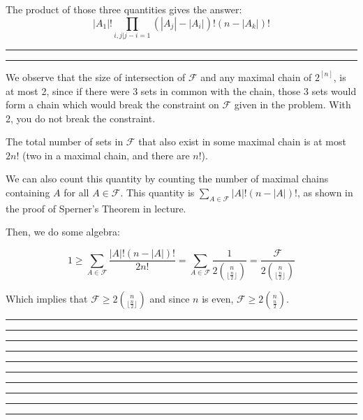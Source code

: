 \documentclass[11pt,letterpaper]{article}
\newcommand{\question}[1] {\vspace{.25in} \hrule\vspace{0.5em}
\noindent{\bf #1} \vspace{0.5em}
\hrule \vspace{.10in}}
\begin{document}
The product of those three quantities gives the answer:
$$|A_1|!\prod_{i,j | j-i = 1} (|A_j| - |A_i|)!(n - |A_k|)!$$

\question{2}
We observe that the size of intersection of $\mathcal{F}$ and any maximal chain of $2^{[n]}$,
is at most 2, since if there were 3 sets in common with the chain,
those 3 sets would form a chain which would break the constraint on $\mathcal{F}$ given in the problem.
With 2, you do not break the constraint.

The total number of sets in $\mathcal{F}$ that also exist in some maximal chain is at most $2n!$ (two in a maximal chain, and there are $n!$).

We can also count this quantity by counting the number of maximal chains containing $A$ for all $A \in \mathcal{F}$. This quantity is $\sum_{A \in \mathcal{F}} |A|!(n-|A|)!$, as shown in the proof of Sperner's Theorem in lecture.

Then, we do some algebra:

$$ 1 \geq \sum_{A \in \mathcal{F}} \frac{|A|!(n-|A|)!}{2n!} = \sum_{A \in \mathcal{F}} \frac{1}{2{n \choose \lfloor \frac{n}{2} \rfloor }} = \frac{\mathcal{F}}{2{n \choose \lfloor \frac{n}{2} \rfloor }}$$

Which implies that $\mathcal{F} \geq 2{n \choose \lfloor \frac{n}{2} \rfloor }$ and since $n$ is even, $\mathcal{F} \geq 2{n \choose \frac{n}{2}}$.


\question{3}

\question{4}

\question{5}

\question{6}

\question{7}
\end{document}
